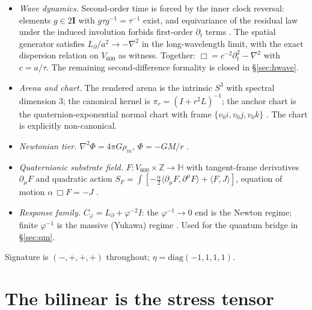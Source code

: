 \documentclass[12pt]{article}
\theoremstyle{definition}
\theoremstyle{remark}
\newcommand{\twoI}{2\mathbf{I}}
\newcommand{\Hq}{\mathbb{H}}
\begin{document}
\begin{itemize}
\item[\textbf{(I1)}] \emph{Wave dynamics.} Second-order time is forced by the inner clock reversal: elements $g \in \twoI$ with $g\tau g^{-1} = \tau^{-1}$ exist, and equivariance of the residual law under the induced involution forbids first-order $\partial_t$ terms \citep{SmartRendering}. The spatial generator satisfies $L_\partial/a^2 \to -\nabla^2$ in the long-wavelength limit, with the exact dispersion relation on $V_{600}$ as witness. Together: $\Box = c^{-2}\partial_t^2 - \nabla^2$ with $c = a/\tau$. The remaining second-difference formality is closed in \S\ref{sec:hwave}.
\item[\textbf{(I2)}] \emph{Arena and chart.} The rendered arena is the intrinsic $S^3$ with spectral dimension 3; the canonical kernel is $\pi_r = (I + r^2 L)^{-1}$; the anchor chart is the quaternion-exponential normal chart with frame $\{v_0 i, v_0 j, v_0 k\}$ \citep{SmartRendering}. The chart is explicitly non-canonical.
\item[\textbf{(I3)}] \emph{Newtonian tier.} $\nabla^2\Phi = 4\pi G \rho_m$, $\Phi = -GM/r$ \citep{SmartKappa}.
\item[\textbf{(I4)}] \emph{Quaternionic substrate field.} $F : V_{600} \times \mathbb{Z} \to \Hq$ with tangent-frame derivatives $\partial_\mu F$ and quadratic action $S_F = \int [-\tfrac{\alpha}{2}\langle\partial_\mu F, \partial^\mu F\rangle + \langle F, J\rangle]$, equation of motion $\alpha\,\Box F = -J$ \citep{SmartKappa}.
\item[\textbf{(I5)}] \emph{Response family.} $C_\varphi = L_\partial + \varphi^{-2} I$: the $\varphi^{-1} \to 0$ end is the Newton regime; finite $\varphi^{-1}$ is the massive (Yukawa) regime \citep{SmartKappa}. Used for the quantum bridge in \S\ref{sec:qm}.
\end{itemize}

Signature is $(-,+,+,+)$ throughout; $\eta = \mathrm{diag}(-1,1,1,1)$.

\section{The bilinear is the stress tensor}\label{sec:stress}
\end{document}
